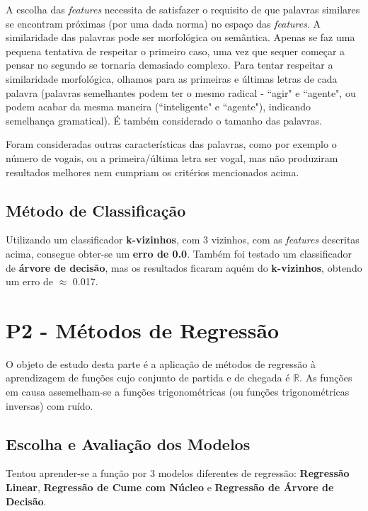 \documentclass[twocolumn, 9pt]{extarticle}
\begin{document}
A escolha das \textit{features} necessita de satisfazer o requisito de que palavras similares se encontram próximas (por uma dada norma) no espaço das \textit{features}. A similaridade das palavras pode ser morfológica ou semântica. Apenas se faz uma pequena tentativa de respeitar o primeiro caso, uma vez que sequer começar a pensar no segundo se tornaria demasiado complexo. Para tentar respeitar a similaridade morfológica, olhamos para as primeiras e últimas letras de cada palavra (palavras semelhantes podem ter o mesmo radical - ``agir" e ``agente", ou podem acabar da mesma maneira (``inteligente" e ``agente"),  indicando semelhança gramatical). É também considerado o tamanho das palavras.\par

Foram consideradas outras características das palavras, como por exemplo o número de vogais, ou a primeira/última letra ser vogal, mas não produziram resultados melhores nem cumpriam os critérios mencionados acima.\par

\subsection{Método de Classificação}

Utilizando um classificador \textbf{k-vizinhos}, com 3 vizinhos, com as \textit{features} descritas acima, consegue obter-se um \textbf{erro de 0.0}. Também foi testado um classificador de \textbf{árvore de decisão}, mas os resultados ficaram aquém do \textbf{k-vizinhos}, obtendo um erro de $\approx$ 0.017.\par

\section{P2 - Métodos de Regressão}
O objeto de estudo desta parte é a aplicação de métodos de regressão à aprendizagem de funções cujo conjunto de partida e de chegada é $\mathbb{R}$. As funções em causa assemelham-se a funções trigonométricas (ou funções trigonométricas inversas) com ruído.\par

\subsection{Escolha e Avaliação dos Modelos}
Tentou aprender-se a função por 3 modelos diferentes de regressão: \textbf{Regressão Linear}, \textbf{Regressão de Cume com Núcleo} e \textbf{Regressão de Árvore de Decisão}.\par
\end{document}
